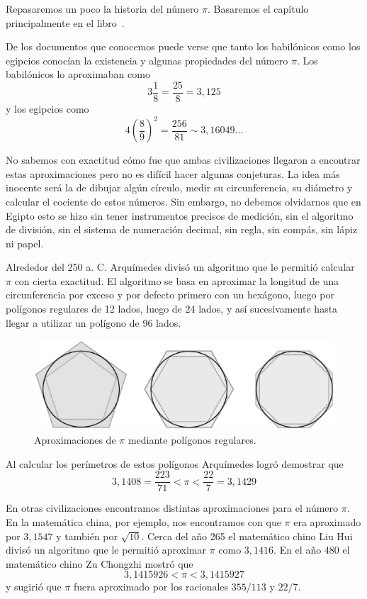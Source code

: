 Repasaremos un poco la historia del número $\pi$. Basaremos el capítulo
principalmente en el libro~\cite{MR0449960}. 

De los documentos que conocemos puede verse que tanto los babilónicos como los
egipcios conocían la existencia y algunas propiedades del número $\pi$. Los
babilónicos lo aproximaban como
\[
	3\frac18=\frac{25}{8}=3,125
\]
y los egipcios como 
\[
	4\left(\frac89\right)^2=\frac{256}{81}\sim 3,16049\dots
\]

No sabemos con exactitud cómo fue que ambas civilizaciones llegaron a encontrar
estas aproximaciones pero no es difícil hacer algunas conjeturas. La idea más
inocente será la de dibujar algún círculo, medir su circunferencia, su diámetro y
calcular el cociente de estos números. Sin embargo, no debemos olvidarnos que
en Egipto esto se hizo sin tener instrumentos precisos de medición, sin el
algoritmo de división, sin el sistema de numeración decimal, sin regla, sin
compás, sin lápiz ni papel. 

Alrededor del 250 a. C. Arquímedes divisó un algoritmo que le permitió calcular
$\pi$ con cierta exactitud. El algoritmo se basa en aproximar la longitud de
una circunferencia por exceso y por defecto primero con un hexágono, luego por
polígonos regulares de 12 lados, luego de 24 lados, y así sucesivamente hasta llegar a utilizar
un polígono de 96 lados. %

\begin{figure}[h]
		\centering
		\includegraphics[scale=0.4]{images/archimedes}
		\caption{Aproximaciones de $\pi$ mediante polígonos regulares.}
		\label{fig:Arquimedes}
\end{figure}

Al calcular los perímetros de estos polígonos
Arquímedes logró demostrar que
\[
	3,1408=\frac{223}{71}<\pi<\frac{22}{7}=3,1429
\]

En otras civilizaciones encontramos distintas aproximaciones para el número
$\pi$. En la matemática china, por ejemplo, nos encontramos con que $\pi$ era
aproximado por $3,1547$ y también por $\sqrt{10}$. Cerca del año 265 el
matemático chino Liu Hui divisó un algoritmo que le permitió aproximar $\pi$
como $3,1416$.  En el año 480 el matemático chino Zu Chongzhi mostró que 
\[
	3,1415926<\pi<3,1415927
\]
y sugirió que $\pi$ fuera aproximado por los racionales $355/113$ y $22/7$. 

